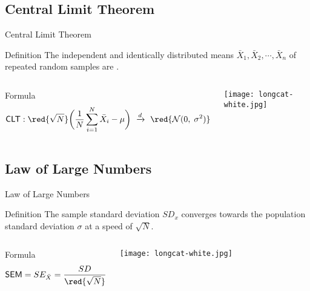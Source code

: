 \documentclass[t]{beamer}
\begin{document}
	\subsection{Central Limit Theorem}

	\begin{frame}[t]{Central Limit Theorem}

			\begin{block}{Definition}
				The independent %
				and identically distributed %
				means $\bar X_1, \bar X_2, \cdots, \bar X_n$ of %
				repeated random samples are %
				.
			\end{block}

			\begin{columns}[T]
		
					\begin{block}{Formula}
						$$\textsf{CLT}: \red{\sqrt{N}}\bigg(\frac{1}{N}\sum_{i=1}^N \bar X_i - \mu\bigg)\ \xrightarrow{d}\ \red{\mathcal{N}(0,\;\sigma^2)}$$
					\end{block}
		

				\vspace{1em}
				\begin{flushright}
					\texttt{[image: longcat-white.jpg]}		
				\end{flushright}
			\end{columns}
		
	\end{frame}

	\subsection{Law of Large Numbers}

	\begin{frame}[t]{Law of Large Numbers}

			\begin{block}{Definition}
				The sample standard deviation $SD_x$ converges towards the population %
				standard deviation $\sigma$ at a speed of $\sqrt{N}$. 
			\end{block}

			\begin{columns}[T]
		
					\begin{block}{Formula}
						$$\textsf{SEM} = SE_{\bar X} = \frac{SD}{\red{\sqrt{N}}}$$
					\end{block}
		

				\vspace{1em}
				\begin{flushright}
					\texttt{[image: longcat-white.jpg]}		
				\end{flushright}
			\end{columns}
		
	\end{frame}
\end{document}
